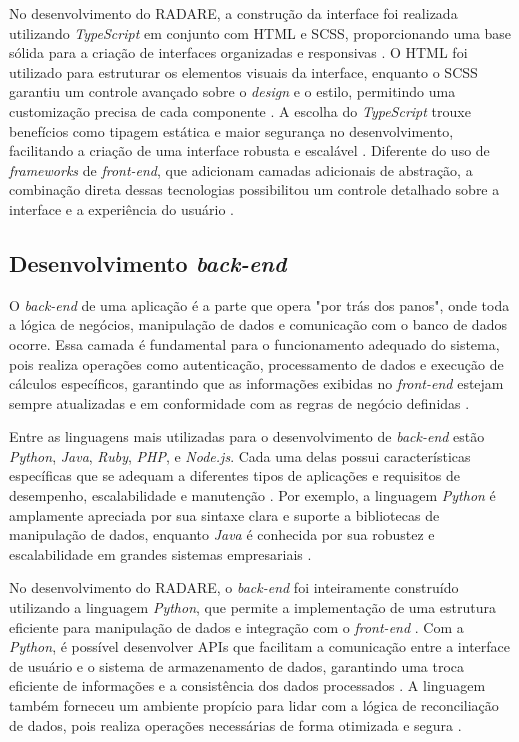 No desenvolvimento do RADARE, a construção da interface foi realizada utilizando \textit{TypeScript} em conjunto com HTML e SCSS, proporcionando uma base sólida para a criação de interfaces organizadas e responsivas \cite{typescriptbook}. O HTML foi utilizado para estruturar os elementos visuais da interface, enquanto o SCSS garantiu um controle avançado sobre o \textit{design} e o estilo, permitindo uma customização precisa de cada componente \cite{htmlcssbook}. A escolha do \textit{TypeScript} trouxe benefícios como tipagem estática e maior segurança no desenvolvimento, facilitando a criação de uma interface robusta e escalável \cite{typescriptsecurity}. Diferente do uso de \textit{frameworks} de \textit{front-end}, que adicionam camadas adicionais de abstração, a combinação direta dessas tecnologias possibilitou um controle detalhado sobre a interface e a experiência do usuário \cite{frontendwithoutframework}.

\subsection{Desenvolvimento \textit{back-end}}

O \textit{back-end} de uma aplicação é a parte que opera "por trás dos panos", onde toda a lógica de negócios, manipulação de dados e comunicação com o banco de dados ocorre. Essa camada é fundamental para o funcionamento adequado do sistema, pois realiza operações como autenticação, processamento de dados e execução de cálculos específicos, garantindo que as informações exibidas no \textit{front-end} estejam sempre atualizadas e em conformidade com as regras de negócio definidas \cite{backendroles}.

Entre as linguagens mais utilizadas para o desenvolvimento de \textit{back-end} estão \textit{Python}, \textit{Java}, \textit{Ruby}, \textit{PHP}, e \textit{Node.js}. Cada uma delas possui características específicas que se adequam a diferentes tipos de aplicações e requisitos de desempenho, escalabilidade e manutenção \cite{backendlanguages}. Por exemplo, a linguagem \textit{Python} é amplamente apreciada por sua sintaxe clara e suporte a bibliotecas de manipulação de dados, enquanto \textit{Java} é conhecida por sua robustez e escalabilidade em grandes sistemas empresariais \cite{javabackend}.

No desenvolvimento do RADARE, o \textit{back-end} foi inteiramente construído utilizando a linguagem \textit{Python}, que permite a implementação de uma estrutura eficiente para manipulação de dados e integração com o \textit{front-end} \cite{pythonweb}. Com a \textit{Python}, é possível desenvolver APIs que facilitam a comunicação entre a interface de usuário e o sistema de armazenamento de dados, garantindo uma troca eficiente de informações e a consistência dos dados processados \cite{pythonapi}. A linguagem também forneceu um ambiente propício para lidar com a lógica de reconciliação de dados, pois realiza operações necessárias de forma otimizada e segura \cite{pythondata}.

